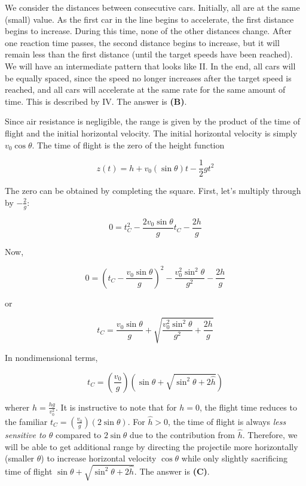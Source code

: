 \documentclass[12pt]{article}
\begin{document}
\vspace{2 \baselineskip}



We consider the distances between consecutive cars. Initially, all are at the same (small) value. As the first car in the line begins to accelerate, the first distance begins to increase. During this time, none of the other distances change. After one reaction time passes, the second distance begins to increase, but it will remain less than the first distance (until the target speeds have been reached). We will have an intermediate pattern that looks like II. In the end, all cars will be equally spaced, since the speed no longer increases after the target speed is reached, and all cars will accelerate at the same rate for the same amount of time. This is described by IV. The answer is \textbf{(B)}.


\vspace{2 \baselineskip}



Since air resistance is negligible, the range is given by the product of the time of flight and the initial horizontal velocity. The initial horizontal velocity is simply $v_0 \cos \theta$. The time of flight is the zero of the height function

$$z (t) = h + v_0 (\sin \theta) t - \frac{1}{2} g t^2$$

The zero can be obtained by completing the square. First, let's multiply through by $-\frac{2}{g}$:

$$0 = t_C^2 - \frac{2 v_0 \sin \theta}{g} t_C - \frac{2 h}{g}$$

Now,

$$0 = \left( t_C - \frac{v_0 \sin \theta}{g} \right)^2 - \frac{v_0^2 \sin^2 \theta}{g^2} - \frac{2 h}{g}$$

or

$$t_C = \frac{v_0 \sin \theta}{g} + \sqrt{\frac{v_0^2 \sin^2 \theta}{g^2} + \frac{2 h}{g}}$$

In nondimensional terms,

$$t_C = \left( \frac{v_0}{g} \right) \left( \sin \theta + \sqrt{\sin^2 \theta + 2 \hat{h}} \right)$$

wherer $\hat{h} = \frac{h g}{v_0^2}$. It is instructive to note that for $h = 0$, the flight time reduces to the familiar $t_C = \left( \frac{v_0}{g} \right) (2 \sin \theta)$. For $\hat{h} > 0$, the time of flight is always \textit{less sensitive to $\theta$} compared to $2 \sin \theta$ due to the contribution from $\hat{h}$. Therefore, we will be able to get additional range by directing the projectile more horizontally (smaller $\theta$) to increase horizontal velocity $\cos \theta$ while only slightly sacrificing time of flight $\sin \theta + \sqrt{\sin^2 \theta + 2 \hat{h}}$. The answer is \textbf{(C)}.
\end{document}
